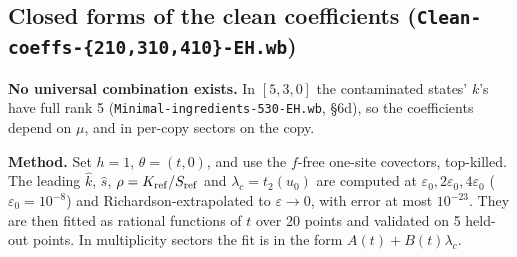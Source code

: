 \documentclass[11pt]{article}
\newcommand{\eps}{\varepsilon}
\begin{document}
\subsection{Closed forms of the clean coefficients (\texttt{Clean-coeffs-\{210,310,410\}-EH.wb})}
\textbf{No universal combination exists.} In $[5,3,0]$ the contaminated states' $k$'s have full rank 5 (\texttt{Minimal-ingredients-530-EH.wb}, \S6d), so the coefficients depend on $\mu$, and in per-copy sectors on the copy.

\textbf{Method.} Set $h=1$, $\theta=(t,0)$, and use the $f$-free one-site covectors, top-killed. The leading $\hat k$, $\hat s$, $\rho=K_{\rm ref}/S_{\rm ref}$ and $\lambda_c=t_2(u_0)$ are computed at $\eps_0,2\eps_0,4\eps_0$ ($\eps_0=10^{-8}$) and Richardson-extrapolated to $\eps\to0$, with error at most $10^{-23}$. They are then fitted as rational functions of $t$ over 20 points and validated on 5 held-out points. In multiplicity sectors the fit is in the form $A(t)+B(t)\lambda_c$.
\end{document}
